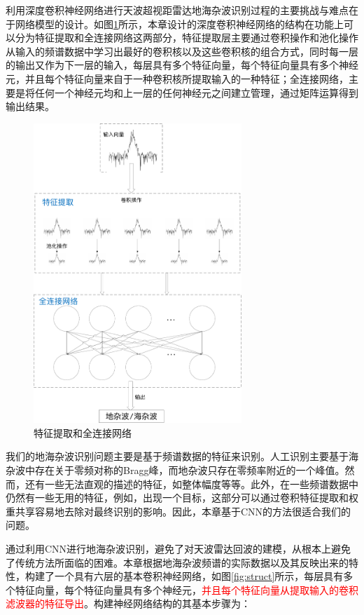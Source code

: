 利用深度卷积神经网络进行天波超视距雷达地海杂波识别过程的主要挑战与难点在于网络模型的设计。如图\ref{fig:fullconnect}所示，本章设计的深度卷积神经网络的结构在功能上可以分为特征提取和全连接网络这两部分，特征提取层主要通过卷积操作和池化操作从输入的频谱数据中学习出最好的卷积核以及这些卷积核的组合方式，同时每一层的输出又作为下一层的输入，每层具有多个特征向量，每个特征向量具有多个神经元，并且每个特征向量来自于一种卷积核所提取输入的一种特征；全连接网络，主要是将任何一个神经元均和上一层的任何神经元之间建立管理，通过矩阵运算得到输出结果。
\begin{figure}[H]
	\centering
	\includegraphics[width=0.7\textwidth]{figures/othr/fullconnect}
	\caption{特征提取和全连接网络}
	\label{fig:fullconnect}
\end{figure}

我们的地海杂波识别问题主要是基于频谱数据的特征来识别。人工识别主要基于海杂波中存在关于零频对称的Bragg峰，而地杂波只存在零频率附近的一个峰值。然而，还有一些无法直观的描述的特征，如整体幅度等等。此外，在一些频谱数据中仍然有一些无用的特征，例如，出现一个目标，这部分可以通过卷积特征提取和权重共享容易地去除对最终识别的影响。因此，本章基于CNN的方法很适合我们的问题。

通过利用CNN进行地海杂波识别，避免了对天波雷达回波的建模，从根本上避免了传统方法所面临的困难。本章根据地海杂波频谱的实际数据以及其反映出来的特性，构建了一个具有六层的基本卷积神经网络，如图\ref{fig:struct}所示，每层具有多个特征向量，每个特征向量具有多个神经元，\textcolor{red}{并且每个特征向量从提取输入的卷积滤波器的特征导出}。构建神经网络结构的其基本步骤为：

